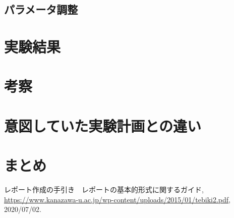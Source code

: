 \documentclass[a4paper, 11pt, titlepage]{jsarticle}
\begin{document}
\subsection{パラメータ調整}


\section{実験結果}


\section{考察}


\section{意図していた実験計画との違い}


\section{まとめ}


\begin{thebibliography}{n}
  レポート作成の手引き　レポートの基本的形式に関するガイド, \url{https://www.kanazawa-u.ac.jp/wp-content/uploads/2015/01/tebiki2.pdf}, 2020/07/02.

\end{thebibliography}
\end{document}
